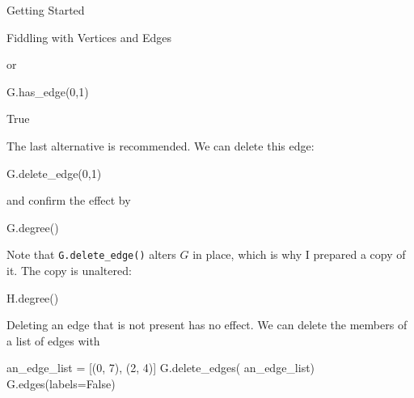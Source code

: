 \begin{chap}{Getting Started}
\begin{sect}{Fiddling with Vertices and Edges}
\begin{sagecode}
\end{sagecode}
%
\begin{para}
or
\end{para}
%
\begin{sagecode}
\begin{sageinput}
G.has_edge(0,1)
\end{sageinput}
\begin{sageoutput}
True
\end{sageoutput}
\end{sagecode}
%
\begin{para}
The last alternative is recommended.
We can delete this edge:
\end{para}
%
\begin{sagecode}
\begin{sageinput}
G.delete_edge(0,1)
\end{sageinput}
\begin{sageoutput}
\end{sageoutput}
\end{sagecode}
%
\begin{para}
and confirm the effect by
\end{para}
%
\begin{sagecode}
\begin{sageinput}
G.degree()
\end{sageinput}
\begin{sageoutput}
[3, 3, 4, 4, 4, 4, 4, 4, 4]
\end{sageoutput}
\end{sagecode}
%
\begin{para}
Note that \verb|G.delete_edge()| alters $G$ in place, which is why I
prepared a copy of it. The copy is unaltered:
\end{para}
%
\begin{sagecode}
\begin{sageinput}
H.degree()
\end{sageinput}
\begin{sageoutput}
[4, 4, 4, 4, 4, 4, 4, 4, 4]
\end{sageoutput}
\end{sagecode}
%
\begin{para}
Deleting an edge that is not present has no effect. We can delete
the members of a list of edges with 
\end{para}
%
\begin{sagecode}
\begin{sageinput}
an_edge_list = [(0, 7), (2, 4)]
G.delete_edges( an_edge_list)
G.edges(labels=False)
\end{sageinput}

\end{sagecode}
\end{sect}
\end{chap}
